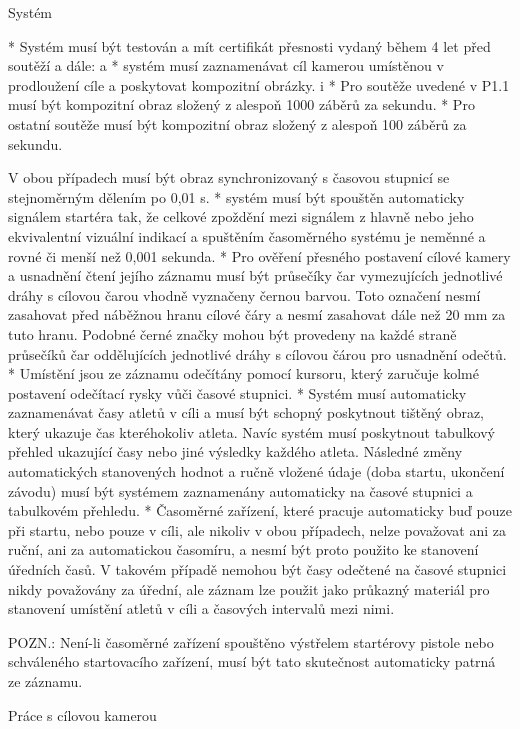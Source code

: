 Systém

* Systém musí být testován a mít certifikát přesnosti vydaný během 4 let před soutěží a dále:
  \begitems \style a
  * systém musí zaznamenávat cíl kamerou umístěnou v prodloužení cíle a poskytovat kompozitní obrázky.
    \begitems \style i
    * Pro soutěže uvedené v P1.1 musí být kompozitní obraz složený z alespoň 1000 záběrů za sekundu.
    * Pro ostatní soutěže musí být kompozitní obraz složený z alespoň 100 záběrů za sekundu.
    \enditems

  V obou případech musí být obraz synchronizovaný s časovou stupnicí se stejnoměrným dělením po 0,01 s.
  * systém musí být spouštěn automaticky signálem startéra tak, že celkové zpoždění mezi signálem z hlavně nebo jeho ekvivalentní vizuální indikací a spuštěním časoměrného systému je neměnné a rovné či menší než 0,001 sekunda.
  \enditems
* Pro ověření přesného postavení cílové kamery a usnadnění čtení jejího záznamu musí být průsečíky čar vymezujících jednotlivé dráhy s cílovou čarou vhodně vyznačeny černou barvou. Toto označení nesmí zasahovat před náběžnou hranu cílové čáry a nesmí zasahovat dále než 20 mm za tuto hranu. Podobné černé značky mohou být provedeny na každé straně průsečíků čar oddělujících jednotlivé dráhy s cílovou čárou pro usnadnění odečtů.
* Umístění jsou ze záznamu odečítány pomocí kursoru, který zaručuje kolmé postavení odečítací rysky vůči časové stupnici.
* Systém musí automaticky zaznamenávat časy atletů v cíli a musí být schopný poskytnout tištěný obraz, který ukazuje čas kteréhokoliv atleta. Navíc systém musí poskytnout tabulkový přehled ukazující časy nebo jiné výsledky každého atleta. Následné změny automatických stanovených hodnot a ručně vložené údaje (doba startu, ukončení závodu) musí být systémem zaznamenány automaticky na časové stupnici a tabulkovém přehledu.
* Časoměrné zařízení, které pracuje automaticky buď pouze při startu, nebo pouze v cíli, ale nikoliv v obou případech, nelze považovat ani za ruční, ani za automatickou časomíru, a nesmí být proto použito ke stanovení úředních časů. V takovém případě nemohou být časy odečtené na časové stupnici nikdy považovány za úřední, ale záznam lze použit jako průkazný materiál pro stanovení umístění atletů v cíli a časových intervalů mezi nimi.

POZN.: Není-li časoměrné zařízení spouštěno výstřelem startérovy pistole nebo schváleného startovacího zařízení, musí být tato skutečnost automaticky patrná ze záznamu.

Práce s cílovou kamerou

